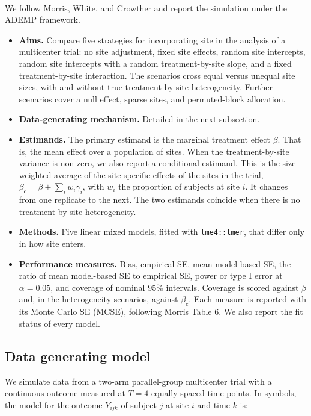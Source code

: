 \documentclass[
  11pt,
]{article}
\providecommand{\tightlist}{%
  \setlength{\itemsep}{0pt}\setlength{\parskip}{0pt}}
\begin{document}
We follow Morris, White, and Crowther\textsuperscript{} and
report the simulation under the ADEMP framework.

\begin{itemize}
\tightlist
\item
  \textbf{Aims.} Compare five strategies for incorporating site in the
  analysis of a multicenter trial: no site adjustment, fixed site
  effects, random site intercepts, random site intercepts with a
  random treatment-by-site slope, and a fixed treatment-by-site
  interaction. The scenarios cross equal versus unequal site sizes,
  with and without true treatment-by-site heterogeneity. Further
  scenarios cover a null effect, sparse sites, and permuted-block
  allocation.
\item
  \textbf{Data-generating mechanism.} Detailed in the next subsection.
\item
  \textbf{Estimands.} The primary estimand is the marginal treatment
  effect \(\beta\). That is, the mean effect over a population of
  sites. When the treatment-by-site variance is non-zero, we also
  report a conditional estimand. This is the size-weighted average
  of the site-specific effects of the sites in the trial,
  \(\beta_{\mathrm{c}} = \beta + \sum_i w_i \gamma_i\), with \(w_i\)
  the proportion of subjects at site \(i\). It changes from one
  replicate to the next. The two estimands coincide when there is
  no treatment-by-site heterogeneity.
\item
  \textbf{Methods.} Five linear mixed models, fitted with
  \texttt{lme4::lmer}, that differ only in how site enters.
\item
  \textbf{Performance measures.} Bias, empirical SE, mean model-based
  SE, the ratio of mean model-based SE to empirical SE, power or
  type I error at \(\alpha = 0.05\), and coverage of nominal 95\%
  intervals. Coverage is scored against \(\beta\) and, in the
  heterogeneity scenarios, against \(\beta_{\mathrm{c}}\). Each
  measure is reported with its Monte Carlo SE (MCSE), following
  Morris Table 6. We also report the fit status of every model.
\end{itemize}

\subsection{Data generating model}\label{data-generating-model}

We simulate data from a two-arm parallel-group multicenter trial
with a continuous outcome measured at \(T = 4\) equally spaced time
points. In symbols, the model for the outcome \(Y_{ijk}\) of subject
\(j\) at site \(i\) and time \(k\) is:
\end{document}
